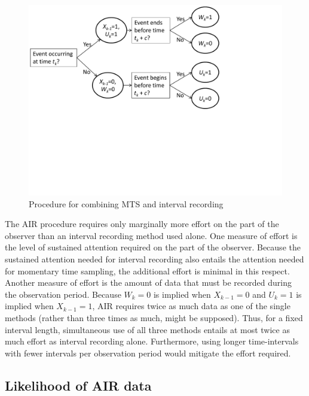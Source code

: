 \documentclass[man, noextraspace, floatsintext]{apa6}\usepackage[]{graphicx}\usepackage[]{color}
\begin{document}
\begin{figure}[hbtp]
\centering
\includegraphics[clip=true, trim= 0 240 150 00, width=0.8\linewidth]{AIR_flowchart.pdf}
\caption{Procedure for combining MTS and interval recording}
\label{fig:questions}
\end{figure}  

The AIR procedure requires only marginally more effort on the part of the observer than an interval recording method used alone. 
One measure of effort is the level of sustained attention required on the part of the observer. Because the sustained attention needed for interval recording also entails the attention needed for momentary time sampling, the additional effort is minimal in this respect. 
Another measure of effort is the amount of data that must be recorded during the observation period. Because $W_k = 0$ is implied when $X_{k-1} = 0$ and $U_k = 1$ is implied when $X_{k-1} = 1$, AIR requires twice as much data as one of the single methods (rather than three times as much, might be supposed). 
Thus, for a fixed interval length, simultaneous use of all three methods entails at most twice as much effort as interval recording alone. 
Furthermore, using longer time-intervals with fewer intervals per observation period would mitigate the effort required.

\subsection{Likelihood of AIR data}
\end{document}
